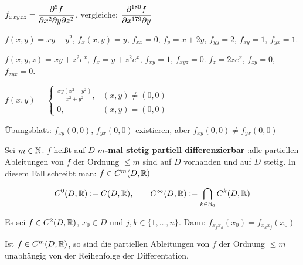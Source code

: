 \documentclass[a4paper,twoside,DIV15,BCOR12mm,chapterprefix=true,headings=twolinechapter]{scrbook}
\begin{document}
\begin{schreibweisen}
$\displaystyle f_{xxyzz} = \frac{\partial^5 f}{\partial x^2\partial y\partial z^2}$, vergleiche: $\displaystyle\frac{\partial^{180} f}{\partial x^{179}\partial y}$
\end{schreibweisen}

\begin{beispiele}
\item $f(x,y) = xy + y^2$, $f_x(x,y)=y$, $f_{xx} = 0$, $f_y = x + 2y$, $f_{yy} = 2$, $f_{xy}=1$, $f_{yx} = 1$.
\item $f(x,y,z) = xy + z^2e^x$, $f_x = y+z^2e^x$, $f_{xy} = 1$, $f_{xyz} = 0$. $f_z=2ze^x$, $f_{zy}=0$, $f_{zyx} = 0$.
\item $f(x,y) = \begin{cases} \frac{xy(x^2-y^2)}{x^2+y^2}, & (x,y) \ne (0,0) \\ 0, &(x,y)=(0,0)\end{cases}$

Übungsblatt: $f_{xy}(0,0)$, $f_{yx}(0,0)$ existieren, aber $f_{xy}(0,0) \ne f_{yx}(0,0)$
\end{beispiele}

\begin{definition}
Sei $m\in\mathbb{N}$. $f$ heißt auf $D$ \textbf{$m$-mal stetig partiell differenzierbar} :\equizu alle partiellen Ableitungen  von $f$ der Ordnung $\le m$ sind auf $D$ vorhanden und auf $D$ stetig. In diesem Fall schreibt man: $f\in C^m(D,\mathbb{R})$

$$C^0(D, \mathbb{R}) := C(D,\mathbb{R}),\qquad C^\infty(D,\mathbb{R}) := \bigcap_{k\in\mathbb{N}_0}C^{k}(D,\mathbb{R})$$
\end{definition}

\begin{satz}
Es sei $f\in C^2(D,\mathbb{R})$, $x_0\in D$ und $j,k\in\{1,\ldots,n\}$. Dann: $f_{x_jx_k}(x_0) = f_{x_kx_j}(x_0)$
\end{satz}

\begin{satz}[Folgerung]
Ist $f\in C^m(D,\mathbb{R})$, so sind die partiellen Ableitungen von $f$ der Ordnung $\le m$ unabhängig von der Reihenfolge der Differentation.
\end{satz}
\end{document}
